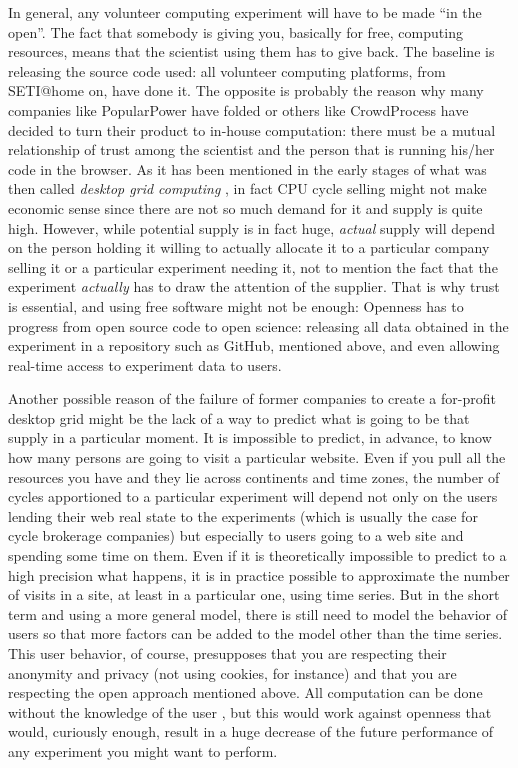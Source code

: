 \documentclass{sig-alternate}
\begin{document}
In general, any volunteer computing experiment will have to be made
``in the open''. The fact that somebody is giving you, basically for
free, computing resources, means that the scientist using them has to
give back. The baseline is releasing the source code used: all
volunteer computing platforms, from SETI@home on, have done it. The
opposite is probably the reason why many companies like PopularPower \cite{buyya2001compute}
have folded or others like CrowdProcess have decided to turn their
product to in-house computation: there must be a mutual relationship
of trust among the scientist and the person that is running his/her
code in the browser. As it has been mentioned in the early stages of what
was then called {\em desktop grid computing} \cite{gc:bausch}, in
fact CPU cycle selling might not make economic sense since there are
not so much demand for it and supply is quite high. However, while
potential supply is in fact huge, {\em actual} supply will depend on
the person holding it willing to actually allocate it to a particular
company selling it or a particular experiment needing it, not to
mention the fact that the experiment {\em actually} has to draw the
attention of the supplier. That is why trust is essential, and using
free software might not be enough: Openness
has to progress from open source code to open science: releasing all
data obtained in the experiment in a repository such as GitHub,
mentioned above, and even allowing real-time access to experiment data
to users.


Another possible reason of the failure of former companies to create a
for-profit desktop grid might be the lack of a way to predict what is
going to be that supply in a particular moment. It is impossible to
predict, in advance, to know how many persons  are going to visit a
particular website. Even if you pull all the resources you have and
they lie across continents and time zones, the number of cycles
apportioned to a particular experiment will depend not only on the
users lending their web real state to the experiments (which is
usually the case for cycle brokerage companies) but especially to
users going to a web site and spending some time on them. Even if it
is theoretically impossible to predict to a high precision what
happens, it is in practice possible to approximate the number of
visits in a site, at least in a particular one, using time series. But
in the short term and using a more general model, there is still need
to model the behavior of users so that more factors can be added to
the model other than the time series. This user behavior, of course,
presupposes that you are respecting their anonymity and privacy (not using
cookies, for instance) and that you are respecting the open approach
mentioned above. All computation can be done without the knowledge of
the user \cite{unwitting-ec}, but this would work against openness
that would, curiously enough, result in a huge decrease of the future
performance of any experiment you might want to perform. 
\end{document}
